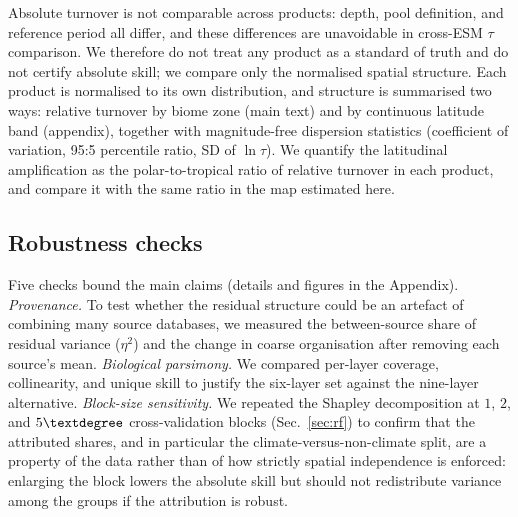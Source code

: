 \documentclass[12pt, a4paper]{article}
\begin{document}
Absolute turnover is not comparable across products: depth, pool definition, and
reference period all differ, and these differences are unavoidable in cross-ESM
$\tau$ comparison. We therefore do not treat any product as a standard of truth and
do not certify absolute skill; we compare only the normalised spatial
structure. Each product is normalised to its own distribution, and structure
is summarised two ways: relative turnover by biome zone (main text) and by
continuous latitude band (appendix), together with magnitude-free dispersion
statistics (coefficient of variation, 95:5 percentile ratio, SD of $\ln\tau$). We
quantify the latitudinal amplification as the polar-to-tropical ratio of relative
turnover in each product, and compare it with the same ratio in the map estimated
here.

\subsection{Robustness checks}
\label{sec:robust}
Five checks bound the main claims (details and figures in the Appendix).
\emph{Provenance.} To test whether the residual structure could be an artefact of
combining many source databases, we measured the between-source share of residual
variance ($\eta^2$) and the change in coarse organisation after removing each
source's mean. \emph{Biological parsimony.} We compared per-layer coverage,
collinearity, and unique skill to justify the six-layer set against the
nine-layer alternative. \emph{Block-size sensitivity.} We repeated the Shapley
decomposition at $1$, $2$, and $5\textdegree$ cross-validation blocks
(Sec.~\ref{sec:rf}) to confirm that the attributed shares, and in particular
the climate-versus-non-climate split, are a property of the data rather than
of how strictly spatial independence is enforced: enlarging the block lowers
the absolute skill but should not redistribute variance among the groups if
the attribution is robust.
\end{document}
